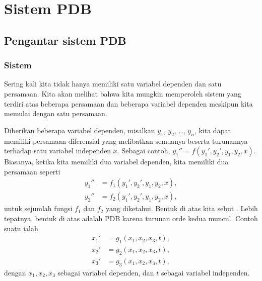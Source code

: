 \chapter{Sistem PDB} \label{sys:chapter}


\section{Pengantar sistem PDB} \label{sec:introtosys}



\subsection{Sistem}

Sering kali kita tidak hanya memiliki satu variabel dependen dan satu persamaan.
Kita akan melihat bahwa kita mungkin memperoleh sistem yang terdiri atas beberapa
persamaan dan beberapa variabel dependen meskipun kita memulai dengan
satu persamaan.

Diberikan beberapa variabel dependen,
misalkan $y_1$, $y_2$, \ldots, $y_n$,
kita dapat memiliki persamaan diferensial yang melibatkan semuanya beserta
turunannya terhadap satu variabel independen $x$.
Sebagai contoh, $y_1'' = f(y_1',y_2',y_1,y_2,x)$.
Biasanya, ketika kita memiliki dua variabel dependen, kita memiliki dua persamaan
seperti
\begin{equation*}
\begin{aligned}
y_1'' & = f_1(y_1',y_2',y_1,y_2,x) , \\
y_2'' & = f_2(y_1',y_2',y_1,y_2,x) ,
\end{aligned}
\end{equation*}
untuk sejumlah fungsi $f_1$ dan $f_2$ yang diketahui.  Bentuk di atas kita sebut
\emph{}.
Lebih tepatnya, bentuk di atas adalah \emph{}
PDB karena turunan orde kedua muncul.
Contoh suatu \emph{} ialah
\begin{equation*}
\begin{aligned}
x_1' & = g_1(x_1,x_2,x_3,t) , \\
x_2' & = g_2(x_1,x_2,x_3,t) , \\
x_3' & = g_3(x_1,x_2,x_3,t) ,
\end{aligned}
\end{equation*}
dengan $x_1,x_2,x_3$ sebagai
variabel dependen,
dan $t$ sebagai variabel independen.

